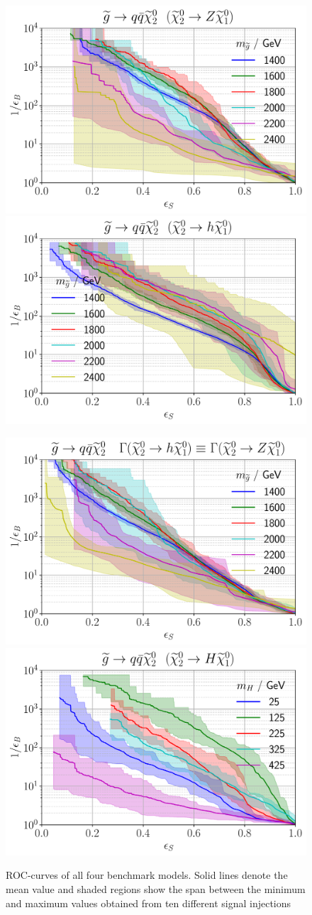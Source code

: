 \documentclass[prd, twocolumn, superscriptaddress,floatfix, nofootinbib, preprintnumbers]{revtex4-2}
\begin{document}
\begin{figure}[ht!]
\centering
\includegraphics[width=0.49\linewidth]{ROC_ZZ.pdf}
\includegraphics[width=0.49\linewidth]{ROC_HH.pdf}

\includegraphics[width=0.49\linewidth]{ROC_HH-HZ-ZZ.pdf}
\includegraphics[width=0.49\linewidth]{ROC_MH.pdf}
\caption{ROC-curves of all four benchmark models. Solid lines denote the mean value and shaded regions show the span between the minimum and maximum values obtained from ten different signal injections}
\label{fig:rocs}
\end{figure}



\end{document}
